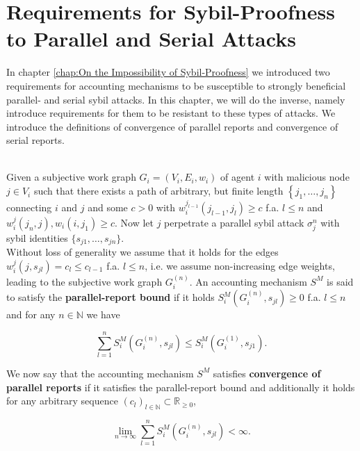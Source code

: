 \section{Requirements for Sybil-Proofness to Parallel and Serial Attacks}
\label{sec:Requirements for Sybil-Proofness to Parallel and Serial Attacks}
\noindent{}In chapter \ref{chap:On the Impossibility of Sybil-Proofness} we introduced two requirements for accounting mechanisms to be susceptible to strongly beneficial parallel- and serial sybil attacks. In this chapter, we will do the inverse, namely introduce requirements for them to be resistant to these types of attacks. We introduce the definitions of convergence of parallel reports and convergence of serial reports. \vspace{1em}\\


\begin{definition}\ \\
\label{def:Convergence of Parallel Reports}
Given a subjective work graph $G_i=(V_i,E_i,w_i)$ of agent $i$ with malicious node $j\in{}V_i$ such that there exists a path of arbitrary, but finite length $\left\lbrace{}j_1,\ldots,j_n\right\rbrace$ connecting $i$ and $j$ and some $c>0$ with $w_i^{j_{l-1}}(j_{l-1},j_l)\geq{}c$ f.a. $l\leq{}n$ and $w_i^j(j_n,j),w_i(i,j_1)\geq{}c$. Now let $j$ perpetrate a parallel sybil attack $\sigma_j^n$ with sybil identities $\lbrace{}s_{j1},\ldots,s_{jn}\rbrace$.\vspace{1em}\\

\noindent{}Without loss of generality we assume that it holds for the edges $w_i^j(j,s_{jl})=c_l\leq{}c_{l-1}$ f.a. $l\leq{}n$, i.e. we assume non-increasing edge weights, leading to the subjective work graph $G^{(n)}_i$. An accounting mechanism $S^M$ is said to satisfy the \textbf{parallel-report bound} if it holds $S^M_i(G^{(n)}_i,s_{jl})\geq{}0$ f.a. $l\leq{}n$ and for any $n\in\mathbb{N}$ we have  

\[
\sum\limits_{l=1}^{n}S^M_i(G^{(n)}_i,s_{jl})\leq{}S^M_i(G^{(1)}_i,s_{j1}).
\]

\noindent{}We now say that the accounting mechanism $S^M$ satisfies \textbf{convergence of parallel reports} if it satisfies the parallel-report bound and additionally it holds for any arbitrary sequence $(c_l)_{l\in\mathbb{N}}\subset\mathbb{R}_{\geq{}0}$, 

\[
\lim\limits_{n\rightarrow\infty}\sum\limits_{l=1}^{n}S^M_i(G^{(n)}_i,s_{jl})<\infty.
\]

\end{definition}

